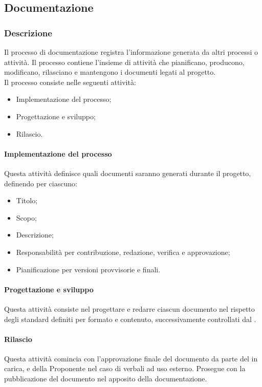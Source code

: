 \subsection{Documentazione}

\subsubsection{Descrizione}
Il processo di documentazione registra l'informazione generata da altri processi o attività. Il processo contiene l'insieme di attività che pianificano, producono, modificano, rilasciano e mantengono i documenti legati al progetto.\\
Il processo consiste nelle seguenti attività:
\begin{itemize}
  \item Implementazione del processo;
  \item Progettazione e sviluppo;
  \item Rilascio.
\end{itemize}

\paragraph{Implementazione del processo}\label{implementazioneprocessodocumentazione}
Questa attività definisce quali documenti saranno generati durante il progetto, definendo per ciascuno:
\begin{itemize}
  \item Titolo;
  \item Scopo;
  \item Descrizione;
  \item Responsabilità per contribuzione, redazione, verifica e approvazione;
  \item Pianificazione per versioni provvisorie e finali.
\end{itemize}

\paragraph{Progettazione e sviluppo}
Questa attività consiste nel progettare e redarre ciascun documento nel rispetto degli standard definiti per formato e contenuto, successivamente controllati dal .

\paragraph{Rilascio}
Questa attività comincia con l'approvazione finale del documento da parte del  in carica, e della Proponente nel caso di verbali ad uso esterno. Prosegue con la pubblicazione del documento nel  apposito della documentazione.

